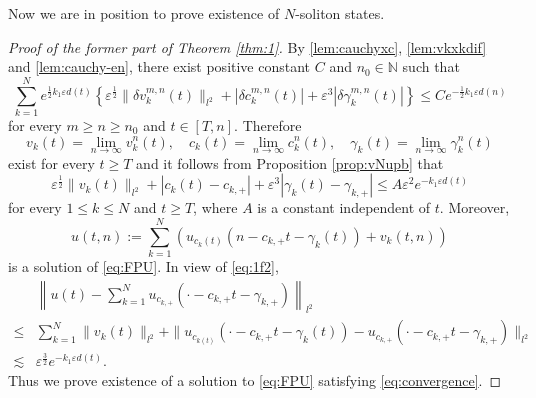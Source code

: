 \documentclass[11pt]{amsart}
\theoremstyle{remark}
\numberwithin{equation}{section}
\begin{document}
Now we are in position to prove existence of $N$-soliton states.
\begin{proof}[Proof of the former part of Theorem \ref{thm:1}]
By \ref{lem:cauchyxc}, \ref{lem:vkxkdif} and \ref{lem:cauchy-en},
there exist positive constant $C$ and $n_0\in{\mathbb{N}}$ such that
\begin{equation}
\label{eq:1f1}
\sum_{k=1}^N e^{\frac12 k_1{\varepsilon} d(t)}\left\{{\varepsilon}^{\frac12}\|{\delta v}_k^{m,n}(t)\|_{l^2}
+|{\delta c}_k^{m,n}(t)|+{\varepsilon}^3|{\delta\gamma}_k^{m,n}(t)|\right\} \le Ce^{-\frac12k_1{\varepsilon} d(n)}
\end{equation}
for every $m\ge n\ge n_0$ and $t\in[T,n]$. Therefore 
$$v_k(t)=\lim_{n\to\infty}v_k^n(t), \quad
c_k(t)=\lim_{n\to\infty}c_k^n(t),\quad
\gamma_k(t)=\lim_{n\to\infty}\gamma_k^n(t)
$$
exist for every $t\ge T$ and it follows from Proposition \ref{prop:vNupb} that
\begin{equation}
  \label{eq:1f2}
 {\varepsilon}^{\frac12}\|v_k(t)\|_{l^2}+|c_k(t)-c_{k,+}|+{\varepsilon}^3|\gamma_k(t)-\gamma_{k,+}|
\le A{\varepsilon}^2e^{-k_1{\varepsilon} d(t)}
\end{equation}
for every $1\le k\le N$ and $t\ge T$, where $A$ is a constant independent of $t$.
Moreover, 
$$u(t,n):=\sum_{k=1}^N\left(u_{c_k(t)}(n-c_{k,+}t-\gamma_k(t))+v_k(t,n)\right)
$$
is a solution of \eqref{eq:FPU}. In view of \eqref{eq:1f2},
\begin{align*}
& \left\|u(t)-\sum_{k=1}^Nu_{c_{k,+}}(\cdot-c_{k,+}t-\gamma_{k,+})\right\|_{l^2}
\\ \le & \sum_{k=1}^N\|v_k(t)\|_{l^2}+
\|u_{c_{k(t)}}(\cdot-c_{k,+}t-\gamma_k(t))-
u_{c_{k,+}}(\cdot-c_{k,+}t-\gamma_{k,+})\|_{l^2}
\\ \lesssim & {\varepsilon}^{\frac32}e^{-k_1{\varepsilon} d(t)}.
\end{align*}
Thus we prove existence of a solution to \eqref{eq:FPU} satisfying
\eqref{eq:convergence}.
\end{proof}
\end{document}
